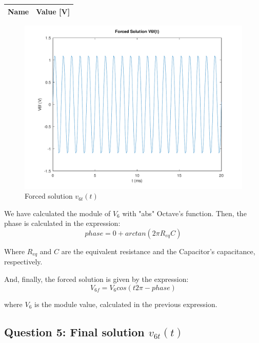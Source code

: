 \begin{center}
  \begin{tabular}{ | c | c | }
    \hline    
    {\bf Name} & {\bf Value [V]} \\ \hline
    
    \hline
  \end{tabular}
\end{center}

\begin{figure}[H] \centering
\includegraphics[width=0.7\linewidth]{../mat/alinea4.pdf}
\caption{Forced solution $v_{6t}(t)$}
\label{fig:plot4}
\end{figure}


We have calculated the module of $V_6$ with "abs" Octave's function. Then, the phase is calculated in the expression:
\begin{equation}
     phase = 0 + arctan({2\pi}{R_{eq}}{C})
\end{equation}\par

Where $R_{eq}$ and $C$ are the equivalent resistance and the Capacitor's capacitance, respectively.

And, finally, the forced solution is given by the expression:
\begin{equation}
     V_{6f}= V_6cos({t}{2\pi} - phase)
\end{equation}\par
where $V_6$ is the module value, calculated in the previous expression.


\subsection{Question 5: Final solution $v_{6t}(t)$ }




